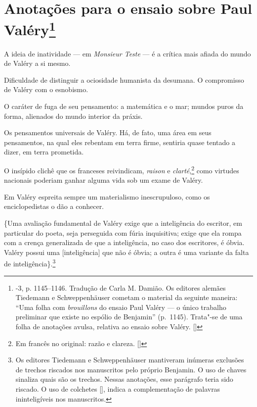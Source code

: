 
\chapter[Anotações para o ensaio sobre Paul Valéry \medskip]{Anotações para o ensaio sobre Paul Valéry\footnote[*]{-3, p. 1145--1146. Tradução de Carla M. Damião. Os
  editores alemães Tiedemann e Schweppenhäuser cometam o material da
  seguinte maneira: ``Uma folha com \emph{brouillons} do ensaio Paul
  Valéry --- o único trabalho preliminar que existe no espólio de
  Benjamin'' (p.~1145). Trata"-se de uma folha de anotações avulsa, relativa ao ensaio sobre Valéry. []}}

A ideia de inatividade --- em \emph{Monsieur Teste} --- é a crítica mais afiada do
mundo de Valéry a si mesmo.

Dificuldade de distinguir a ociosidade humanista da desumana. O
compromisso de Valéry com o esnobismo.

O caráter de fuga de seu pensamento: a matemática e o mar; mundos puros
da forma, alienados do mundo interior da práxis.

Os pensamentos universais de Valéry. Há, de fato, uma área em seus
pensamentos, na qual eles rebentam em terra firme, sentiria quase tentado
a dizer, em terra prometida.

O insípido clichê que os franceses reivindicam, \emph{raison} e
\emph{clarté},\footnote{Em francês no original: razão e clareza. []} como virtudes nacionais poderiam ganhar alguma vida
sob um exame de Valéry.

Em Valéry espreita sempre um materialismo inescrupuloso, como os
enciclopedistas o dão a conhecer.

\{Uma avaliação fundamental de Valéry exige que a inteligência do escritor,
em particular do poeta, seja perseguida com fúria inquisitiva; exige que
ela rompa com a crença generalizada de que a inteligência, no caso dos
escritores, é óbvia. Valéry possui uma {[}inteligência{]} que não é %
óbvia; a outra é uma variante da falta de inteligência\}.\footnote{Os editores Tiedemann e Schweppenhäuser mantiveram inúmeras
exclusões de trechos riscados nos manuscritos pelo próprio Benjamin. O uso de chaves {} sinaliza quais são os trechos. Nessas anotações, esse parágrafo teria sido riscado. O uso de colchetes [], indica a complementação de palavras ininteligíveis nos manuscritos.}

